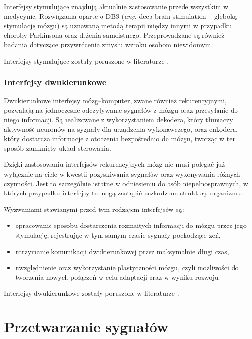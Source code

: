 \documentclass[skorowidz,skroty]{dyplomWEZUT}
\begin{document}
Interfejsy stymulujące znajdują aktualnie zastosowanie przede wszystkim w medycynie. Rozwiązania oparte o DBS (\textit{ang.} deep brain stimulation -- głęboką stymulację mózgu) są uznawaną metodą terapii między innymi w przypadku choroby Parkinsona oraz drżenia samoistnego. Przeprowadzane są również badania dotyczące przywrócenia zmysłu wzroku osobom niewidomym\cite{bci_introduction}.

Interfejsy stymulujące zostały poruszone w literaturze \cite{bci_introduction,bci_stimulate1,bci_stimulate2}.

\subsubsection{Interfejsy dwukierunkowe}
Dwukierunkowe interfejsy mózg--komputer, zwane również rekurencyjnymi, pozwalają na jednoczesne odczytywanie sygnałów z mózgu oraz przesyłanie do niego informacji. Są realizowane z wykorzystaniem dekodera, który tłumaczy aktywność neuronów na sygnały dla urządzenia wykonawczego, oraz enkodera, który dostarcza informacje z otoczenia bezpośrednio do mózgu, tworząc w ten sposób zamknięty układ sterowania\cite{bci_bidir1}.

Dzięki zastosowaniu interfejsów rekurencyjnych mózg nie musi polegać już wyłącznie na ciele w kwestii pozyskiwania sygnałów oraz wykonywania różnych czynności\cite{bci_introduction}. Jest to szczególnie istotne w odniesieniu do osób niepełnosprawnych, w których przypadku interfejsy te mogą zastąpić uszkodzone struktury organizmu.

Wyzwaniami stawianymi przed tym rodzajem interfejsów są\cite{bci_introduction}:
\begin{itemize}
    \item opracowanie sposobu dostarczenia rozmaitych informacji do mózgu przez jego stymulację, rejestrując w tym samym czasie sygnały pochodzące zeń,
    \item utrzymanie komunikacji dwukierunkowej przez maksymalnie długi czas,
    \item uwzględnienie oraz wykorzystanie plastyczności mózgu, czyli możliwości do tworzenia nowych połączeń w celu adaptacji oraz w wyniku rozwoju.
\end{itemize}

Interfejsy dwukierunkowe zostały poruszone w literaturze \cite{bci_introduction,bci_bidir1,bci_bidir2}.




\section{Przetwarzanie sygnałów}
\end{document}
